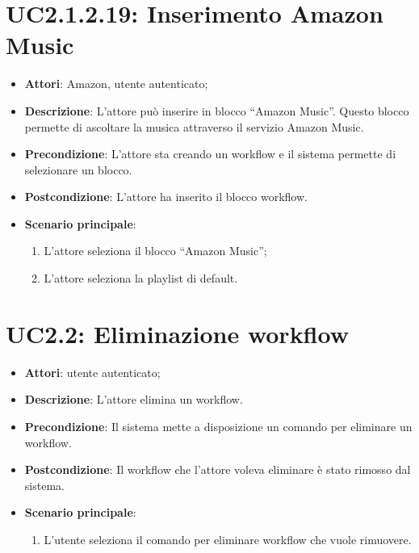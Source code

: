 \section{UC2.1.2.19: Inserimento Amazon Music}
\label{UC2.1.2.19}
\begin{itemize}
	\item \textbf{Attori}: Amazon, utente autenticato;
	\item \textbf{Descrizione}: L'attore può inserire in blocco ``Amazon Music''. Questo blocco permette di ascoltare la musica attraverso il servizio Amazon Music.
	\item \textbf{Precondizione}: L'attore sta creando un workflow e il sistema permette di selezionare un blocco.	
	\item \textbf{Postcondizione}: L'attore ha inserito il blocco workflow.
	\item \textbf{Scenario principale}:
	\begin{enumerate} \item L'attore seleziona il blocco ``Amazon Music'';  \item  L'attore seleziona la playlist di default.\end{enumerate}
\end{itemize}

\section{UC2.2: Eliminazione workflow}
\label{UC2.2}
\begin{itemize}
	\item \textbf{Attori}: utente autenticato;
	\item \textbf{Descrizione}: L'attore elimina un workflow.
	\item \textbf{Precondizione}: Il sistema mette a disposizione un comando per eliminare un workflow.
	\item \textbf{Postcondizione}: Il workflow che l'attore voleva eliminare è stato rimosso dal sistema.
	\item \textbf{Scenario principale}:
	\begin{enumerate} \item L'utente seleziona il comando per eliminare workflow che vuole rimuovere.\end{enumerate}
\end{itemize}

